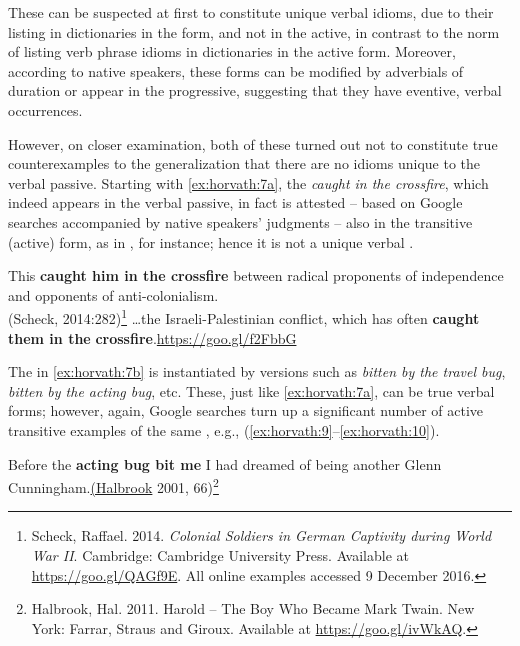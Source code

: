 \documentclass[output=paper,
modfonts
]{LSP/langsci}
\begin{document}
These  can be suspected at first to constitute unique
verbal  idioms, due to their listing in  dictionaries in the
 form, and not in the active, in contrast to the norm of listing
verb phrase idioms in dictionaries in the active form. Moreover, according to native speakers, these forms can be modified by adverbials of duration or appear in the progressive, suggesting that they have eventive, verbal occurrences.

However, on closer examination, both of these turned out not to
constitute true counterexamples to the generalization that there are no
idioms unique to the verbal passive. Starting with \ref{ex:horvath:7a}, the 
\emph{caught in the crossfire}, which indeed appears in the verbal
passive, in fact is attested -- based on Google searches accompanied by
native speakers' judgments -- also in the transitive (active) form, as
in , for instance; hence it is not a unique verbal  .

\ea \label{ex:horvath:8}
	\ea \label{ex:horvath:8a} This \textbf{caught him in the crossfire} between radical
	proponents of independence and  opponents of anti-colonialism.\\
	\hfill (Scheck, 2014:282)\footnote{Scheck, Raffael. 2014. \emph{ Colonial
  	Soldiers in German Captivity during World War II}. Cambridge:
  	Cambridge University Press. Available at \url{https://goo.gl/QAGf9E}. All online examples 	accessed 9 December 2016.}
	\ex \label{ex:horvath:8b} \ldots{}the Israeli-Palestinian conflict, which has often \textbf{caught them in the }
	\textbf{crossfire}.\hfill \url{https://goo.gl/f2FbbG}
	\z
\z

The  in \ref{ex:horvath:7b} is instantiated by versions such as \emph{bitten by
the travel bug}, \emph{bitten by the acting bug}, etc. These, just like
\ref{ex:horvath:7a}, can be true verbal  forms; however, again, Google searches
turn up a significant number of active transitive examples of the same
, e.g., (\ref{ex:horvath:9}--\ref{ex:horvath:10}).

\ea \label{ex:horvath:9} 	Before the \textbf{acting bug bit me} I had dreamed of being another
	Glenn Cunningham.\hfill \href{https://books.google.co.il/books?isbn=1429969016}{(Halbrook} 			2001, 66)\footnote{Halbrook, Hal. 2011. Harold -- The Boy Who Became Mark Twain. New
 	York: Farrar, Straus and Giroux. Available at \url{https://goo.gl/ivWkAQ}.}
	
\end{document}
